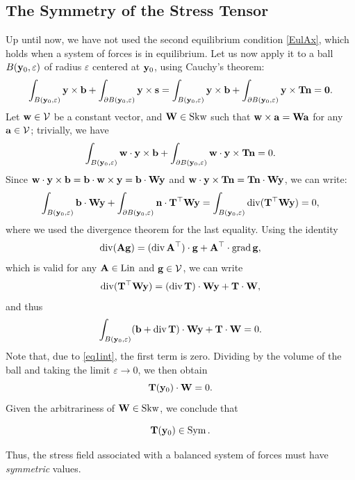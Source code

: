 \subsection{The Symmetry of the Stress Tensor}
Up until now, we have not used the second equilibrium condition \eqref{EulAx}, which holds when a system of forces is in equilibrium. Let us now apply it to a ball \( B(\mathbf{y}_0, \varepsilon) \) of radius \(\varepsilon\) centered at \(\mathbf{y}_0\), using Cauchy's theorem:
\begin{equation}
	\int_{ B(\mathbf{y}_0, \varepsilon)} \mathbf{y} \times \mathbf{b} + \int_{ \partial B(\mathbf{y}_0, \varepsilon)} \mathbf{y} \times \mathbf{s} = \int_{ B(\mathbf{y}_0, \varepsilon)} \mathbf{y} \times \mathbf{b} + \int_{ \partial B(\mathbf{y}_0, \varepsilon)} \mathbf{y} \times \mathbf{T} \mathbf{n} = \mathbf{0}.
\end{equation}
Let \(\mathbf{w} \in \mathcal{V}\) be a constant vector, and \(\mathbf{W} \in \operatorname{Skw}\) such that \(\mathbf{w} \times \mathbf{a} = \mathbf{W} \mathbf{a}\) for any \(\mathbf{a} \in \mathcal{V}\); trivially, we have
\begin{equation}
	\int_{ B(\mathbf{y}_0, \varepsilon)} \mathbf{w} \cdot \mathbf{y} \times \mathbf{b} + \int_{ \partial B(\mathbf{y}_0, \varepsilon)} \mathbf{w} \cdot \mathbf{y} \times \mathbf{T} \mathbf{n} = 0.
\end{equation}
Since \(\mathbf{w} \cdot \mathbf{y} \times \mathbf{b} = \mathbf{b} \cdot \mathbf{w} \times \mathbf{y} = \mathbf{b} \cdot \mathbf{W} \mathbf{y}\) and \(\mathbf{w} \cdot \mathbf{y} \times \mathbf{T} \mathbf{n} = \mathbf{T} \mathbf{n} \cdot \mathbf{W} \mathbf{y}\), we can write:
\begin{equation}
	\int_{ B(\mathbf{y}_0, \varepsilon)} \mathbf{b} \cdot \mathbf{W} \mathbf{y} + \int_{ \partial B(\mathbf{y}_0, \varepsilon)} \mathbf{n} \cdot \mathbf{T}^\top \mathbf{W} \mathbf{y} = \int_{ B(\mathbf{y}_0, \varepsilon)} \operatorname{div}(\mathbf{T}^\top \mathbf{W} \mathbf{y}) = 0,
\end{equation}
where we used the divergence theorem for the last equality. Using the identity
\begin{equation}
	\operatorname{div} (\mathbf{A} \mathbf{g}) = (\operatorname{div} \mathbf{A}^\top) \cdot \mathbf{g} + \mathbf{A}^\top \cdot \operatorname{grad} \mathbf{g},
\end{equation}
which is valid for any \(\mathbf{A} \in \operatorname{Lin}\) and \(\mathbf{g} \in \mathcal{V}\), we can write
\begin{equation}
	\operatorname{div}(\mathbf{T}^\top \mathbf{W} \mathbf{y}) = (\operatorname{div} \mathbf{T}) \cdot \mathbf{W} \mathbf{y} + \mathbf{T} \cdot \mathbf{W},
\end{equation}
and thus
\begin{equation}
	\int_{ B(\mathbf{y}_0, \varepsilon)} (\mathbf{b} + \operatorname{div} \mathbf{T}) \cdot \mathbf{W} \mathbf{y} + \mathbf{T} \cdot \mathbf{W} = 0.
\end{equation}
Note that, due to \eqref{eq1int}, the first term is zero. Dividing by the volume of the ball and taking the limit \(\varepsilon \to 0\), we then obtain
\begin{equation}
	\mathbf{T}(\mathbf{y}_0) \cdot \mathbf{W} = 0.
\end{equation}
Given the arbitrariness of \(\mathbf{W} \in \operatorname{Skw}\), we conclude that
\begin{definition}
	\begin{equation}
		\mathbf{T}(\mathbf{y}_0) \in \operatorname{Sym}.
	\end{equation}
\end{definition}
Thus, the stress field associated with a balanced system of forces must have \textit{symmetric} values.

